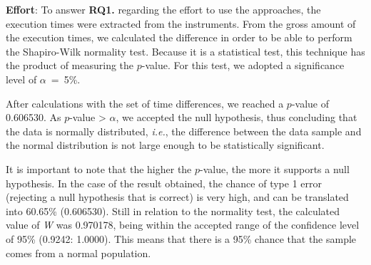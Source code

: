 \documentclass[a4paper,twoside,anonymous]{article}
\begin{document}

\textbf{Effort}: To answer \textbf{RQ1.} regarding the effort to use the approaches, the execution times were extracted from the instruments.
From the gross amount of the execution times, we calculated the difference in order to be able to perform the Shapiro-Wilk normality test.
Because it is a statistical test, this technique has the product of measuring the $p$-value.
For this test, we adopted a significance level of $\alpha$~=~5\%.

After calculations with the set of time differences, we reached a $p$-value of 0.606530.
As $p$-value > $\alpha$, we accepted the null hypothesis, thus concluding that the data is normally distributed,
\textit{i.e.}, the difference between the data sample and the normal distribution is not large enough to be statistically significant.

It is important to note that the higher the $p$-value, the more it supports a null hypothesis.
In the case of the result obtained, the chance of type 1 error (rejecting a null hypothesis that is correct) is very high, and can be translated into 60.65\% (0.606530).
Still in relation to the normality test, the calculated value of \textit{W} was 0.970178, being within the accepted range of the confidence level of 95\% (0.9242: 1.0000).
This means that there is a 95\% chance that the sample comes from a normal population.

\end{document}
